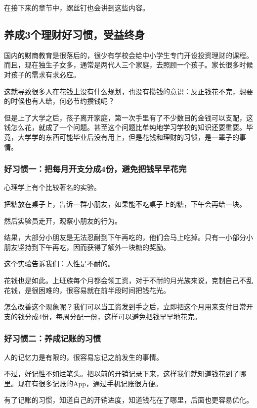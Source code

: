 在接下来的章节中，螺丝钉也会讲到这些内容。

\subsection{养成3个理财好习惯，受益终身}
国内的财商教育是很落后的，很少有学校会给中小学生专门开设投资理财的课程。而且，现在独生子女多，通常是两代人三个家庭，去照顾一个孩子。家长很多时候对孩子的需求有求必应。

这就导致很多人在花钱上没有什么规划，也没有攒钱的意识：反正钱花不完，想要的时候也有人给，何必节约攒钱呢？

但是上了大学之后，孩子离开家庭，第一次手里有了不少数目的金钱可以支配，这钱怎么花，就成了一个问题。甚至这个问题比单纯地学习学校的知识还要重要。毕竟，大学学的东西可能毕业后没有用上，但是花钱和理财的习惯，是一辈子的事情。

\subsubsection{好习惯一：把每月开支分成4份，避免把钱早早花完}

心理学上有个比较著名的实验。

{\kaishu 把糖放在桌子上，告诉一群小朋友，如果能不吃桌子上的糖，下午会再给一块。}

{\kaishu 然后实验员走开，观察小朋友的行为。}

{\kaishu 结果，大部分小朋友是无法忍耐到下午再吃的，他们会马上吃掉。只有一小部分小朋友坚持到下午再吃，因而获得了额外一块糖的奖励。}

这个实验告诉我们：人性是不耐的。

花钱也是如此。上班族每个月都会领工资，对于不耐的月光族来说，克制自己不乱花钱，是很困难的，很容易就在前半段时间把钱花光。

怎么改善这个现象呢？我们可以当工资发到手之后，立即把这个月用来支付日常开支的钱分成4份，每周分配一份，这样可以避免把钱早早地花完。

\subsubsection{好习惯二：养成记账的习惯}

人的记忆力是有限的，很容易忘记之前发生的事情。

不过，好记性不如烂笔头。把以前的开销记录下来，这样我们就知道钱花到了哪里。现在有很多记账的App，通过手机记账很方便。

有了记账的习惯，知道自己的开销进度，知道钱花在了哪里，后面也更容易优化。

